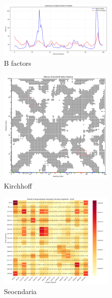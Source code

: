 \documentclass{article}
\begin{document}
\begin{figure}[H]
    \centering
    \includegraphics[width=0.5\textwidth]{"images/3LNYConfronto tra Fattori B Reali e Predetti.png"}
    \caption{B factors}
\end{figure}
\begin{figure}[H]
    \centering
    \includegraphics[width=0.5\textwidth]{"images/3LNY_Matrice di Kirchhoff della Proteina.png"}
    \caption{Kirchhoff}
\end{figure}
\begin{figure}[H]
    \centering
    \includegraphics[width=0.5\textwidth]{"images/2m10analyze_secondary_structure_transfer_entropy.png"}
    \caption{Seocndaria}
\end{figure}
\end{document}
